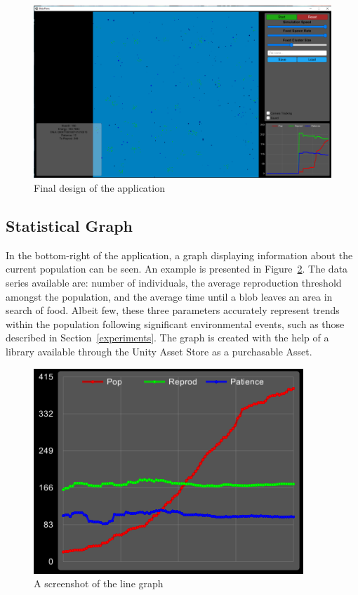 \begin{figure}[!th]
	\centering
	\includegraphics[scale=0.315]{images/finalui}
	\caption{\label{fig:finalui}Final design of the application}
\end{figure}

\subsection{Statistical Graph} \label{sgraph}

In the bottom-right of the application, a graph displaying information about the current population can be seen. An example is presented in Figure~\ref{fig:graph}. The data series available are: number of individuals, the average reproduction threshold amongst the population, and the average time until a blob leaves an area in search of food. Albeit few, these three parameters accurately represent trends within the population following significant environmental events, such as those described in Section~\ref{experiments}. The graph is created with the help of a library available through the Unity Asset Store as a purchasable Asset\cite{graphmaker}.

\begin{figure}[!th]
	\centering
	\includegraphics[scale=0.85]{images/graph}
	\caption{\label{fig:graph}A screenshot of the line graph}
\end{figure}

